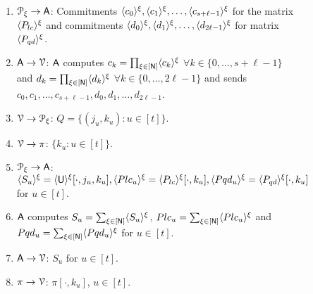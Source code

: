 \begin{figure*}[h]
{\begin{framed}
\begin{enumerate}[{\rm 1.}]
\begin{itemize}
					\item[--] $h\times n$ matrices $\shr{P_{lc}}$ and $\shr{P_{qd}}$ as ``P'' matrices for the linear check and quadratic check respectively. Note that $\shr{p_j}$ polynomial for $\shr{P_{lc}}$ is given by $\shr{p_j}(\cdot)=\sum_{i=1}^p(R^i(\alpha_j,\cdot) \cdot \shr{Q_x^i}(\alpha_j,\cdot) + R^{p+i}( \alpha_j, \cdot ) \shr{Q^i_y}( \alpha_j , \cdot ) + R^{2p+i}( \alpha_j , \cdot ) \shr{Q^i_z} ( \alpha_j , \cdot ) + R^{3p+i}( \alpha_j , \cdot ) \shr{Q^i}( \alpha_j , \cdot ))$. The $\shr{p_j}$ polynomials for the matrix $\shr{P_{qd}}$ are given by $\shr{p_j}( \cdot ) = \sum_{i=1}^{p} r_{qd}[i] ( \shr{Q^i_{xy}} ( \alpha_j , \cdot ) - \shr{Q^i_z} ( \alpha_j , \cdot ))$.
					\item[--] Blinding vectors $\shr{U_{lc}},\shr{U_{qd}}\in \FF^{2m-1}$ for linear and quadratic check protocols respectively, and commitments $\shr{c_0},\shr{d_0}$ to vectors $\shr{U_{lc}}$ and $\shr{U_{qd}}$.
				\end{itemize}
				\item $\mathcal{P}_\xi\rightarrow\mathsf{A}$: Commitments $\langle{c_0}\rangle^\xi,\langle{c_1}\rangle^\xi,\ldots,\langle{c_{s+\ell-1}}\rangle^\xi$ for the matrix $\shr{P_{lc}}$ and commitments $ \langle{d_0}\rangle^\xi , \langle{d_1}\rangle^\xi , \ldots , \langle{d_{2\ell-1}}\rangle^\xi $ for matrix $\shr{P_{qd}}$.
				\item $\mathsf{A} \rightarrow \mathcal{V}$: $\mathsf{A}$ computes $c_k = \prod_{\xi \in [\mathsf{N}]} \langle{c_k}\rangle^\xi$ $\forall k\in \{0,\ldots, s+\ell-1\}$ and $d_k = \prod_{\xi \in [\mathsf{N}]} \langle{d_k}\rangle^\xi$ $\forall k\in \{0,\ldots,2\ell-1\}$ and sends $c_0,c_1,\ldots, c_{s+\ell-1}, d_0,d_1,\ldots,d_{2\ell-1}$.
				\item $\mathcal{V}\rightarrow\mathcal{P}_\xi$: $Q=\{(j_u,k_u):u\in [t]\}$.
				\item $\mathcal{V}\rightarrow\pi$: $\{k_u:u\in [t]\}$.
				\item $\mathcal{P}_\xi\rightarrow\mathsf{A}$: $\langle{S_u}\rangle^\xi=\langle{\mathsf{U}}\rangle^\xi[\cdot,j_u,k_u], \langle{Plc_{u}}\rangle^\xi=\langle{P_{lc}}\rangle^\xi[\cdot,k_u], \langle{Pqd_{u}}\rangle^\xi=\langle{P_{qd}}\rangle^\xi[\cdot,k_u]$ for $u\in [t]$.
				\item $\mathsf{A}$ computes $S_u=\sum_{\xi\in [\mathsf{N}]} \langle{S_u}\rangle^\xi$, $Plc_{u}=\sum_{\xi\in [\mathsf{N}]}\langle{Plc_{u}}\rangle^\xi$ and $Pqd_{u}=\sum_{\xi\in [\mathsf{N}]}\langle{Pqd_{u}}\rangle^\xi$ for $u\in [t]$.
				\item $\mathsf{A} \rightarrow \mathcal{V}$: $S_u$ for $u\in[t]$.
				\item $\pi\rightarrow\mathcal{V}$: $\pi[\cdot,k_u]$, $u\in [t]$.

\end{enumerate}
\end{framed}}
\end{figure*}

